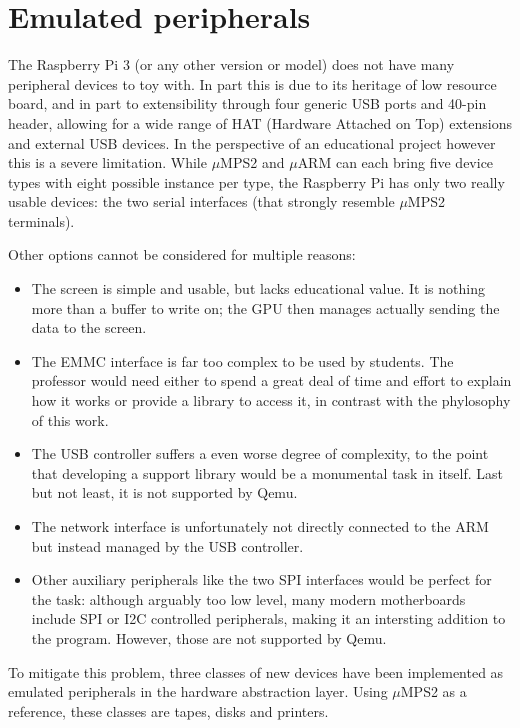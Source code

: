 \documentclass[12pt,a4paper,openright,twoside]{report}
\begin{document}
\clearpage{\pagestyle{empty}\cleardoublepage}
\chapter{Emulated peripherals}
\label{emulated}
The Raspberry Pi 3 (or any other version or model) does not have many peripheral
devices to toy with. In part this is due to its heritage of low resource board, 
and in part to extensibility through four generic USB ports and 40-pin header,
allowing for a wide range of HAT (Hardware Attached on Top) extensions and external
USB devices.
In the perspective of an educational project however this is a severe limitation.
While $\mu$MPS2 and $\mu$ARM can each bring five device types with eight possible
instance per type, the Raspberry Pi has only two really usable devices: the 
two serial interfaces (that strongly resemble $\mu$MPS2 terminals).

Other options cannot be considered for multiple reasons:
\begin{itemize}
    \item The screen is simple and usable, but lacks educational value. It is 
        nothing more than a buffer to write on; the GPU then manages actually
        sending the data to the screen.
    \item The EMMC interface is far too complex to be used by students. The professor
        would need either to spend a great deal of time and effort to explain how
        it works or provide a library to access it, in contrast with the phylosophy
        of this work.
    \item The USB controller suffers a even worse degree of complexity, to the point
        that developing a support library would be a monumental task in itself.
        Last but not least, it is not supported by Qemu.
    \item The network interface is unfortunately not directly connected to the ARM
        but instead managed by the USB controller.
    \item Other auxiliary peripherals like the two SPI interfaces would be perfect
        for the task: although arguably too low level, many modern motherboards
        include SPI or I2C controlled peripherals, making it an intersting addition
        to the program. However, those are not supported by Qemu.
\end{itemize}

To mitigate this problem, three classes of new devices have been implemented as 
emulated peripherals in the hardware abstraction layer. Using $\mu$MPS2 as a reference,
these classes are tapes, disks and printers.
\end{document}

